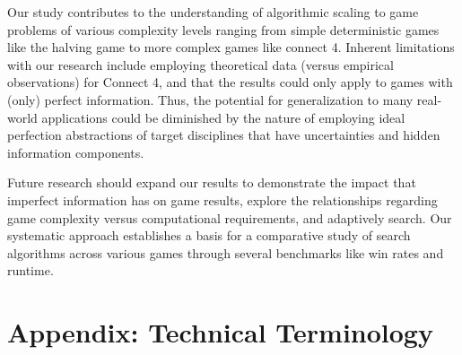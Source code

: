 \documentclass[12pt]{article}
\begin{document}
Our study contributes to the understanding of algorithmic scaling to game problems of various complexity levels ranging from simple deterministic games like the halving game to more complex games like connect 4. Inherent limitations with our research include employing theoretical data (versus empirical observations) for Connect 4, and that the results could only apply to games with (only) perfect information. Thus, the potential for generalization to many real-world applications could be diminished by the nature of employing ideal perfection abstractions of target disciplines that have uncertainties and hidden information components. 

Future research should expand our results to demonstrate the impact that imperfect information has on game results, explore the relationships regarding game complexity versus computational requirements, and adaptively search. Our systematic approach establishes a basis for a comparative study of search algorithms across various games through several benchmarks like win rates and runtime.

\section*{Appendix: Technical Terminology}
\end{document}
